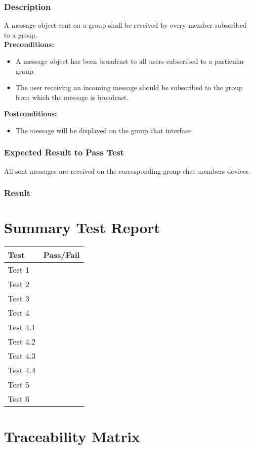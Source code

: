 \documentclass[11pt]{article}
\begin{document}
\subsubsection{Description}
A message object sent on a group shall be received
by every member subscribed to a group.\\
\textbf{Preconditions:} 
\begin{itemize}
\item A message object has been broadcast to all users subscribed to a particular group.
\item The user receiving an incoming message should be subscribed to the
group from which the message is broadcast.
\end{itemize}
\textbf{Postconditions:}
\begin{itemize}
\item The message will be displayed on the group chat interface
\end{itemize}
\subsubsection{Expected Result to Pass Test}
All sent messages are received on the corresponding group chat members devices.
\subsubsection{Result}

\section{Summary Test Report}
\begin{table}[h]
\begin{tabular}{ll}
\textbf{Test}     & \textbf{Pass/Fail} \\ \hline
\multicolumn{1}{|L{10cm}|}{Test 1} & \multicolumn{1}{L{2cm}|}{} \\ \hline
\multicolumn{1}{|L{10cm}|}{Test 2} & \multicolumn{1}{L{2cm}|}{} \\ \hline
\multicolumn{1}{|L{10cm}|}{Test 3} & \multicolumn{1}{L{2cm}|}{} \\ \hline
\multicolumn{1}{|L{10cm}|}{Test 4} & \multicolumn{1}{L{2cm}|}{} \\ \hline
\multicolumn{1}{|L{10cm}|}{Test 4.1} & \multicolumn{1}{L{2cm}|}{} \\ \hline
\multicolumn{1}{|L{10cm}|}{Test 4.2} & \multicolumn{1}{L{2cm}|}{} \\ \hline
\multicolumn{1}{|L{10cm}|}{Test 4.3} & \multicolumn{1}{L{2cm}|}{} \\ \hline
\multicolumn{1}{|L{10cm}|}{Test 4.4} & \multicolumn{1}{L{2cm}|}{} \\ \hline
\multicolumn{1}{|L{10cm}|}{Test 5} & \multicolumn{1}{L{2cm}|}{} \\ \hline
\multicolumn{1}{|L{10cm}|}{Test 6} & \multicolumn{1}{L{2cm}|}{} \\ \hline
\end{tabular}
\end{table}

\section{Traceability Matrix}
\end{document}
